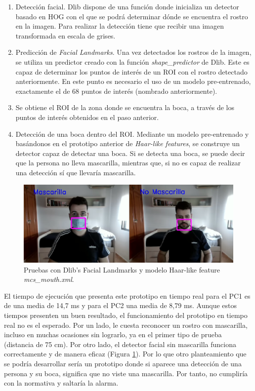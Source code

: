 \begin{enumerate}
	\item Detección facial. Dlib dispone de una función donde inicializa un detector basado en HOG con el que se podrá determinar dónde se encuentra el rostro en la imagen. Para realizar la detección tiene que recibir una imagen transformada en escala de grises.
	\item Predicción de \textit{Facial Landmarks}. Una vez detectados los rostros de la imagen, se utiliza un predictor creado con la función \textit{shape\_predictor} de Dlib. Este es capaz de determinar los puntos de interés de un ROI con el rostro detectado anteriormente. En este punto es necesario el uso de un modelo pre-entrenado, exactamente el de 68 puntos de interés (nombrado anteriormente).
	\item Se obtiene el ROI de la zona donde se encuentra la boca, a través de los puntos de interés obtenidos en el paso anterior.
	\item Detección de una boca dentro del ROI. Mediante un modelo pre-entrenado y basándonos en el prototipo anterior de \textit{Haar-like features}, se construye un detector capaz de detectar una boca. Si se detecta una boca, se puede decir que la persona no lleva mascarilla, mientras que, si no es capaz de realizar una detección sí que llevaría mascarilla.
\end{enumerate}

\begin{figure}[htp]
	\centering
	\includegraphics[width=12cm]{imagenes/landmark_prueba.png}
	\caption[Pruebas con Dlib's Facial Landmarks y modelo Haar-like feature \textit{mcs\_mouth}.]{Pruebas con Dlib's Facial Landmarks y modelo Haar-like feature \textit{mcs\_mouth.xml}.}
	\label{fig:dlibLandmarks}
\end{figure}

El tiempo de ejecución que presenta este prototipo en tiempo real para el PC1 es de una media de 14,7 ms y para el PC2 una media de 8,79 ms. Aunque estos tiempos presenten un buen resultado, el funcionamiento del prototipo en tiempo real no es el esperado. Por un lado, le cuesta reconocer un rostro con mascarilla, incluso en muchas ocasiones sin lograrlo, ya en el primer tipo de prueba (distancia de 75 cm). Por otro lado, el detector facial sin mascarilla funciona correctamente y de manera eficaz (Figura \ref{fig:dlibLandmarks}). Por lo que otro planteamiento que se podría desarrollar sería un prototipo donde si aparece una detección de una persona y su boca, significa que no viste una mascarilla. Por tanto, no cumpliría con la normativa y saltaría la alarma.

